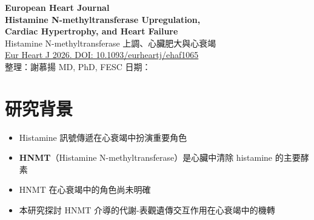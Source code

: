 \documentclass[12pt,a4paper]{article}
\begin{document}
\begin{center}
{\LARGE\bfseries\textcolor{emergency_red}{European Heart Journal}}\\[0.5cm]
{\Large\textbf{Histamine N-methyltransferase Upregulation,\\Cardiac Hypertrophy, and Heart Failure}}\\[0.3cm]
{\large Histamine N-methyltransferase 上調、心臟肥大與心衰竭}\\[0.5cm]
{\normalsize \href{https://doi.org/10.1093/eurheartj/ehaf1065}{Eur Heart J 2026. DOI: 10.1093/eurheartj/ehaf1065}}\\[0.3cm]
{\normalsize 整理：謝慕揚 MD, PhD, FESC \quad 日期：\mydate}
\end{center}

\vspace{0.5cm}


\section{研究背景}

\begin{itemize}
    \item Histamine 訊號傳遞在心衰竭中扮演重要角色
    \item \textbf{HNMT}（Histamine N-methyltransferase）是心臟中清除 histamine 的主要酵素
    \item HNMT 在心衰竭中的角色尚未明確
    \item 本研究探討 HNMT 介導的代謝-表觀遺傳交互作用在心衰竭中的機轉
\end{itemize}

\end{document}
